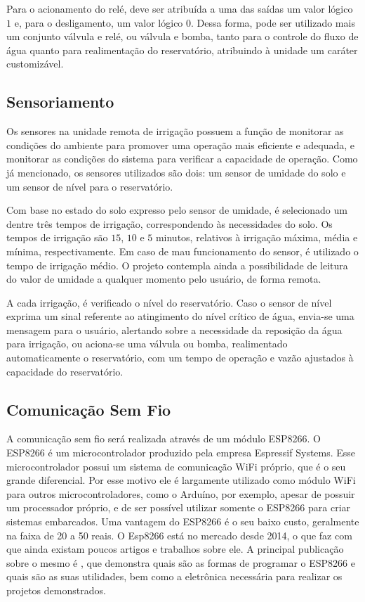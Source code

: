 \documentclass[conference]{IEEEtran}
\begin{document}
Para o acionamento do relé, deve ser atribuída a uma das saídas um valor lógico $1$ e, para o desligamento, um valor lógico $0$. Dessa forma, pode ser utilizado mais um conjunto válvula e relé, ou válvula e bomba, tanto para o controle do fluxo de água quanto para realimentação do reservatório, atribuindo à unidade um caráter customizável.

\subsection{Sensoriamento}

Os sensores na unidade remota de irrigação possuem a função de monitorar as condições do ambiente para promover uma operação mais eficiente e adequada, e monitorar as condições do sistema para verificar a capacidade de operação. Como já mencionado, os sensores utilizados são dois: um sensor de umidade do solo e um sensor de nível para o reservatório.

Com base no estado do solo expresso pelo sensor de umidade, é selecionado um dentre três tempos de irrigação, correspondendo às necessidades do solo. Os tempos de irrigação são $15$, $10$ e $5$ minutos, relativos à irrigação máxima, média e mínima, respectivamente. Em caso de mau funcionamento do sensor, é utilizado o tempo de irrigação médio. O projeto contempla ainda a possibilidade de leitura do valor de umidade a qualquer momento pelo usuário, de forma remota.

A cada irrigação, é verificado o nível do reservatório. Caso o sensor de nível exprima um sinal referente ao atingimento do nível crítico de água, envia-se uma mensagem para o usuário, alertando sobre a necessidade da reposição da água para irrigação, ou aciona-se uma válvula ou bomba, realimentado automaticamente o reservatório, com um tempo de operação e vazão ajustados à capacidade do reservatório.

\subsection{Comunicação Sem Fio}

A comunicação sem fio será realizada através de um módulo ESP8266. O ESP8266 é um microcontrolador produzido pela empresa Espressif Systems. Esse microcontrolador possui um sistema de comunicação WiFi próprio, que é o seu grande diferencial. Por esse motivo ele é largamente utilizado como módulo WiFi para outros microcontroladores, como o Arduíno, por exemplo, apesar de possuir um processador próprio, e de ser possível utilizar somente o ESP8266 para criar sistemas embarcados. Uma vantagem do ESP8266 é o seu baixo custo, geralmente na faixa de 20 a 50 reais. O Esp8266 está no mercado desde 2014, o que faz com que ainda existam poucos artigos e trabalhos sobre ele. A principal publicação sobre o mesmo é \cite{b2}, que demonstra quais são as formas de programar o ESP8266 e quais são as suas utilidades, bem como a eletrônica necessária para realizar os projetos demonstrados. 
\end{document}
